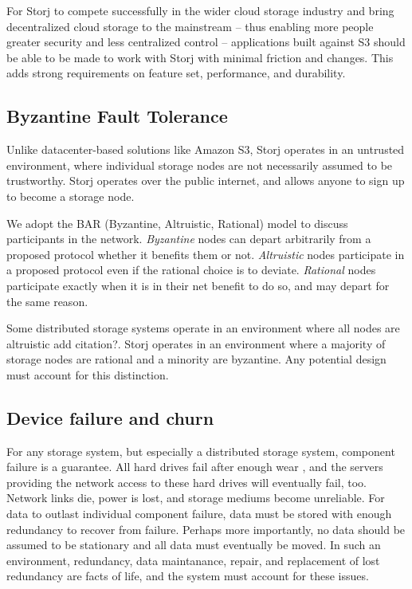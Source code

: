 \documentclass[a4paper,10pt]{article}
\begin{document}
For Storj to compete successfully in the wider cloud storage industry and bring
decentralized cloud storage to the mainstream -- thus enabling more people
greater security and less centralized control -- applications built against S3
should be able to be made to work with Storj with minimal friction and changes.
This adds strong requirements on feature set, performance, and durability.

\subsection{Byzantine Fault Tolerance}

Unlike datacenter-based solutions like Amazon S3, Storj operates in an
untrusted environment, where individual storage nodes are not necessarily assumed
to be trustworthy. Storj operates over the public internet, and allows
anyone to sign up to become a storage node.

We adopt the BAR (Byzantine, Altruistic, Rational) model \cite{bar} to discuss
participants in the network.
  {\em Byzantine} nodes can depart arbitrarily from a proposed protocol whether it benefits them or not.
  {\em Altruistic} nodes participate in a proposed protocol even if the rational choice is to deviate.
  {\em Rational} nodes participate exactly when it is in their net benefit to do so, and may depart for the same reason.

Some distributed storage systems operate in an environment where all nodes are
altruistic {\color{red}add citation?}. Storj operates in an environment where a majority of storage
nodes are rational and a minority are byzantine. Any potential
design must account for this distinction.

\subsection{Device failure and churn}

For any storage system, but especially a distributed storage system, component
failure is a guarantee. All hard drives fail
after enough wear \cite{backblaze-hd-2018-q1}, and the servers providing
the network access to these hard drives will eventually fail, too. Network
links die, power is lost, and storage mediums become unreliable. For data
to outlast individual component failure, data must be stored with enough
redundancy to recover from failure. Perhaps more importantly, no data should be
assumed to be stationary and all data must eventually be moved. In such an environment, redundancy, data maintanance, repair, and replacement of lost redundancy are facts of life, and the system must account for these issues.
\end{document}
